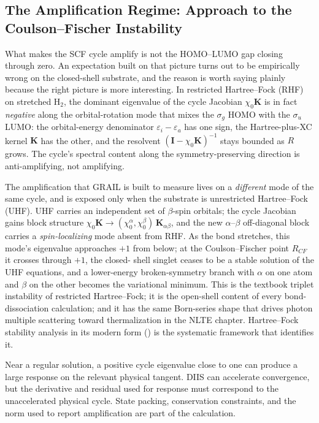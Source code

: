 \documentclass[11pt]{article}
\begin{document}
\subsection{The Amplification Regime: Approach to the Coulson--Fischer Instability}
\label{sec:scf-amplification}

What makes the SCF cycle amplify is not the HOMO--LUMO gap closing
through zero.  An expectation built on that picture turns out to be
empirically wrong on the closed-shell substrate, and the reason is
worth saying plainly because the right picture is more interesting.
In restricted Hartree--Fock (RHF) on stretched H$_2$, the dominant
eigenvalue of the cycle Jacobian $\chi_0\mathbf{K}$ is in fact
\emph{negative} along the orbital-rotation mode that mixes the
$\sigma_g$ HOMO with the $\sigma_u$ LUMO: the orbital-energy
denominator $\varepsilon_i - \varepsilon_a$ has one sign, the
Hartree-plus-XC kernel $\mathbf{K}$ has the other, and the resolvent
$(\mathbf{I} - \chi_0\mathbf{K})^{-1}$ stays bounded as $R$ grows.
The cycle's spectral content along the symmetry-preserving direction
is anti-amplifying, not amplifying.

The amplification that GRAIL is built to measure lives on a
\emph{different} mode of the same cycle, and is exposed only when the
substrate is unrestricted Hartree--Fock (UHF).  UHF carries an
independent set of $\beta$-spin orbitals; the cycle Jacobian gains
block structure
$\chi_0\mathbf{K} \to
(\chi_0^{\alpha}, \chi_0^{\beta}) \,
\mathbf{K}_{\alpha\beta}$,
and the new $\alpha$--$\beta$ off-diagonal block carries a
\emph{spin-localizing} mode absent from RHF.  As the bond stretches,
this mode's eigenvalue approaches $+1$ from below; at the
Coulson--Fischer point $R_{CF}$ it crosses through $+1$, the closed-
shell singlet ceases to be a stable solution of the UHF equations,
and a lower-energy broken-symmetry branch with $\alpha$ on one atom
and $\beta$ on the other becomes the variational minimum.  This is
the textbook \citet{CizekPaldus1967} triplet instability of
restricted Hartree--Fock; it is the open-shell content of every
bond-dissociation calculation; and it has the same Born-series shape
that drives photon multiple scattering toward thermalization in the
NLTE chapter.  Hartree--Fock stability analysis in its modern form
(\citealt{McWeeny1992,Helgaker2000}) is the systematic framework that
identifies it.

Near a regular solution, a positive cycle eigenvalue close to one can
produce a large response on the relevant physical tangent. DIIS can
accelerate convergence, but the derivative and residual used for response
must correspond to the unaccelerated physical cycle. State packing,
conservation constraints, and the norm used to report amplification are
part of the calculation.
\end{document}
